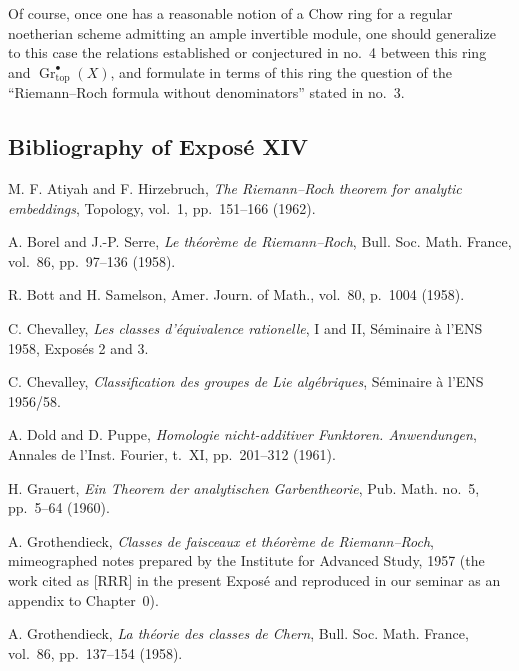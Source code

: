\documentclass[11pt]{article}
\newcommand{\Gtop}{\operatorname{Gr}_{\mathrm{top}}}
\begin{document}
Of course, once one has a reasonable notion of a Chow ring for a regular
noetherian scheme admitting an ample invertible module, one should
generalize to this case the relations established or conjectured in no.~4
between this ring and $\Gtop^\bullet(X)$, and formulate in terms of this ring
the question of the ``Riemann--Roch formula without denominators'' stated in
no.~3.

\subsection*{Bibliography of Expos\'e XIV}

\begin{enumerate}[label={[\arabic*]},leftmargin=3.2em]
\item M. F. Atiyah and F. Hirzebruch,
  \emph{The Riemann--Roch theorem for analytic embeddings},
  Topology, vol.~1, pp.~151--166 (1962).

\item A. Borel and J.-P. Serre,
  \emph{Le th\'eor\`eme de Riemann--Roch},
  Bull. Soc. Math. France, vol.~86, pp.~97--136 (1958).

\item R. Bott and H. Samelson,
  Amer. Journ. of Math., vol.~80, p.~1004 (1958).

\item C. Chevalley,
  \emph{Les classes d'\'equivalence rationelle}, I and II,
  S\'eminaire \`a l'ENS 1958, Expos\'es 2 and 3.

\item C. Chevalley,
  \emph{Classification des groupes de Lie alg\'ebriques},
  S\'eminaire \`a l'ENS 1956/58.

\item A. Dold and D. Puppe,
  \emph{Homologie nicht-additiver Funktoren. Anwendungen},
  Annales de l'Inst. Fourier, t.~XI, pp.~201--312 (1961).

\item H. Grauert,
  \emph{Ein Theorem der analytischen Garbentheorie},
  Pub. Math. no.~5, pp.~5--64 (1960).

\item A. Grothendieck,
  \emph{Classes de faisceaux et th\'eor\`eme de Riemann--Roch},
  mimeographed notes prepared by the Institute for Advanced Study, 1957
  (the work cited as [RRR] in the present Expos\'e and reproduced in our
  seminar as an appendix to Chapter~0).

\item A. Grothendieck,
  \emph{La th\'eorie des classes de Chern},
  Bull. Soc. Math. France, vol.~86, pp.~137--154 (1958).


\end{enumerate}
\end{document}
